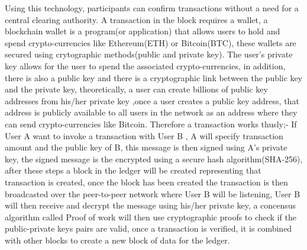 \documentclass[a4paper,12pt]{article}
\begin{document}
Using this technology, participants can confirm transactions without a need for a central clearing authority. A transaction in the block requires a wallet, a blockchain wallet is a program(or application) that allows users to hold and spend crypto-currencies like Ethereum(ETH) or Bitcoin(BTC), these wallets are secured using crytographic methods(public and private key). The user's private key allows for the user to spend the associated crypto-currencies, in addition, there is also a public key and there is a cryptographic link between the public key and the private key, theoretically, a user can create billions of public key addresses from his/her private key ,once a user creates a public key address, that address is publicly available to all users in the network as an address where they can send crypto-currencies like Bitcoin. Therefore a transaction works thusly;- If User A want to invoke a transaction with User B , A will specify transaction amount and the public key of B, this message is then signed using A's private key, the signed message is the encrypted using a secure hash algorithm(SHA-256), after these steps a block in the ledger will be created representing that transaction is created,  once the block has been created the transaction is then broadcasted over the peer-to-peer network where User B will be listening, User B will then receive and decrypt the message using his/her private key, a concensus algorithm called Proof of work will then use cryptographic proofs to check if the public-private keys pairs are valid, once a transaction is verified, it is combined with other blocks to create a new block of data for the ledger. \\
\end{document}
